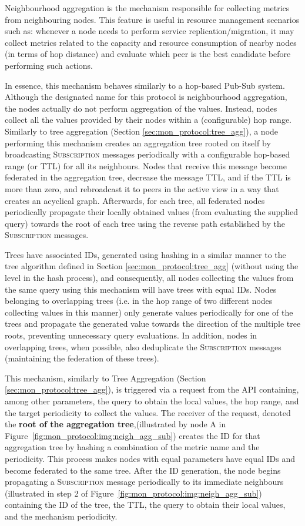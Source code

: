 Neighbourhood aggregation is the mechanism responsible for collecting metrics from neighbouring nodes. This feature is useful in resource management scenarios such as: whenever a node needs to perform service replication/migration, it may collect metrics related to the capacity and resource consumption of nearby nodes (in terms of hop distance) and evaluate which peer is the best candidate before performing such actions. 

In essence, this mechanism behaves similarly to a hop-based Pub-Sub system. Although the designated name for this protocol is neighbourhood aggregation, the nodes actually do not perform aggregation of the values. Instead, nodes collect all the values provided by their nodes within a (configurable) hop range. Similarly to tree aggregation (Section \ref{sec:mon_protocol:tree_agg}), a node performing this mechanism creates an aggregation tree rooted on itself by broadcasting \textsc{Subscription} messages periodically with a configurable hop-based range (or TTL) for all its neighbours. Nodes that receive this message become federated in the aggregation tree, decrease the message TTL, and if the TTL is more than zero, and rebroadcast it to peers in the active view in a way that creates an acyclical graph. Afterwards, for each tree, all federated nodes periodically propagate their locally obtained values (from evaluating the supplied query) towards the root of each tree using the reverse path established by the \textsc{Subscription} messages. 

Trees have associated IDs, generated using hashing in a similar manner to the tree algorithm defined in Section \ref{sec:mon_protocol:tree_agg} (without using the level in the hash process), and consequently, all nodes collecting the values from the same query using this mechanism will have trees with equal IDs. Nodes belonging to overlapping trees (i.e. in the hop range of two different nodes collecting values in this manner) only generate values periodically for one of the trees and propagate the generated value towards the direction of the multiple tree roots, preventing unnecessary query evaluations. In addition, nodes in overlapping trees, when possible, also deduplicate the \textsc{Subscription} messages (maintaining the federation of these trees).

This mechanism, similarly to Tree Aggregation (Section \ref{sec:mon_protocol:tree_agg}), is triggered via a request from the API containing, among other parameters, the query to obtain the local values, the hop range, and the target periodicity to collect the values. The receiver of the request, denoted the \textbf{root of the aggregation tree},(illustrated by node A in Figure~\ref{fig:mon_protocol:img:neigh_agg_sub}) creates the ID for that aggregation tree by hashing a combination of the metric name and the periodicity. This process makes nodes with equal parameters have equal IDs and become federated to the same tree. After the ID generation, the node begins propagating a \textsc{Subscription} message periodically to its immediate neighbours (illustrated in step 2 of Figure~\ref{fig:mon_protocol:img:neigh_agg_sub}) containing the ID of the tree, the TTL, the query to obtain their local values, and the mechanism periodicity. 

